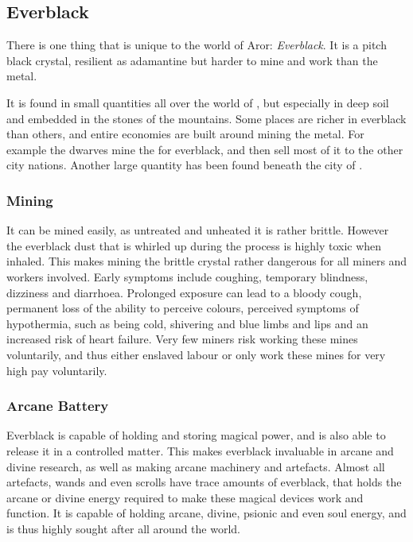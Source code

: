 \subsection{Everblack}
\label{sec:Everblack}

There is one thing that is unique to the world of Aror: \emph{Everblack}. It is
a pitch black crystal, resilient as adamantine but harder to mine and work than
the metal.

It is found in small quantities all over the world of , but
especially in deep soil and embedded in the stones of the mountains. Some
places are richer in everblack than others, and entire economies are built
around mining the metal. For example the dwarves  mine
the  for everblack, and then sell most of it to
the other city nations. Another large quantity has been found beneath the
city of .

\subsubsection{Mining}

It can be mined easily, as untreated and unheated it is rather brittle. However
the everblack dust that is whirled up during the process is highly toxic when
inhaled. This makes mining the brittle crystal rather dangerous for all miners
and workers involved. Early symptoms include coughing, temporary blindness,
dizziness and diarrhoea. Prolonged exposure can lead to a bloody cough,
permanent loss of the ability to perceive colours, perceived symptoms of
hypothermia, such as being cold, shivering and blue limbs and lips and an
increased risk of heart failure. Very few miners risk working these mines
voluntarily, and thus either enslaved labour or only work these mines for very
high pay voluntarily.

\subsubsection{Arcane Battery}

Everblack is capable of holding and storing magical power, and is also able to
release it in a controlled matter. This makes everblack invaluable in arcane
and divine research, as well as making arcane machinery and artefacts. Almost
all artefacts, wands and even scrolls have trace amounts of everblack, that
holds the arcane or divine energy required to make these magical devices work
and function. It is capable of holding arcane, divine, psionic and even soul
energy, and is thus highly sought after all around the world.


